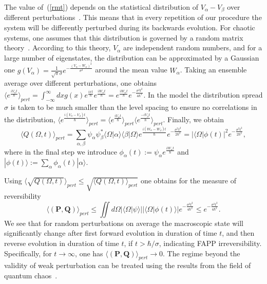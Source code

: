 \documentclass[12pt,a4]{article}
\begin{document}
The value of~(\ref{rmt}) depends on the statistical distribution of $V_\alpha-V_\beta$ over different perturbations~\cite{peres3}. This means that in every repetition of our procedure the system will be differently perturbed during its backwards evolution. For chaotic systems, one assumes that this distribution is governed by a random matrix theory~\cite{chaos}. According to this theory,  $V_\alpha$ are independent random numbers, and for a large number of eigenstates, the distribution can be approximated by a Gaussian one $g(V_\alpha)=\frac{1}{\sqrt{\pi}\sigma} e^{-\frac{(V_\alpha-W_\alpha)^2}{\sigma^2}}$ around the mean value $W_\alpha$. Taking an ensemble average over different perturbations, one obtains $\langle e^{\frac{iV_\alpha t}{\hbar}} \rangle_{pert} = \int^\infty_{-\infty} dx g(x) e^{\frac{ixt}{\hbar}} e^{\frac{iW_\alpha t}{\hbar}} = e^{\frac{iW_\alpha t}{\hbar}} e^{-\frac{\sigma^2 t^2}{4\hbar^2}}$. In the model the distribution spread $\sigma$ is taken to be much smaller than the level spacing to ensure no correlations in the distribution, $\langle e^{\frac{i(V_\alpha-V_\beta) t}{\hbar}} \rangle_{pert} = \langle e^{\frac{iV_\alpha t}{\hbar}} \rangle_{pert}\langle e^{\frac{-iV_\beta t}{\hbar}} \rangle_{pert}$. Finally, we obtain
\begin{equation}
\langle Q(\Omega,t) \rangle_{pert}= \sum_{\alpha,\beta} \psi_\alpha \psi^{*}_\beta \langle \Omega |\alpha  \rangle \langle \beta|\Omega \rangle e^{\frac{i (W_\alpha - W_\beta) t}{\hbar}}e^{-\frac{\sigma^2 t^2}{2\hbar^2}}=|\langle\Omega|\phi(t)|^2 e^{-\frac{\sigma^2 t^2}{2\hbar^2}}, 
\end{equation}
where in the final step we introduce $\phi_\alpha (t):= \psi_\alpha e^{\frac{iW_\alpha t}{\hbar}}$ and $ |\phi(t)\rangle:=\sum_\alpha \phi_\alpha(t) |\alpha\rangle$.

Using $\langle \sqrt{Q(\Omega,t)} \rangle_{pert} \leq \sqrt{\langle Q(\Omega,t) \rangle_{pert}}$ one obtains for the measure of reversibility
\begin{equation}
\langle({\mathbf P},{\mathbf Q})\rangle_{pert} \leq \iint d\Omega 
|\langle \Omega |\psi\rangle| |\langle \Omega| \phi (t) \rangle| e^{-\frac{\sigma^2 t^2}{4\hbar^2}} \leq e^{-\frac{\sigma^2 t^2}{4\hbar^2}}.
\end{equation}
We see that for random perturbations on average the macroscopic state will significantly change after first forward evolution in duration of time $t$, and then reverse evolution in duration of time $t$, if $t > \hbar/\sigma$, indicating FAPP irreversibility. Specifically, for $t\rightarrow \infty$, one has $\langle({\mathbf P},{\mathbf Q})\rangle_{pert} \rightarrow 0$. The regime beyond the validity of weak perturbation can be treated using the results from the field of quantum chaos~\cite{jacquod}.
\end{document}
